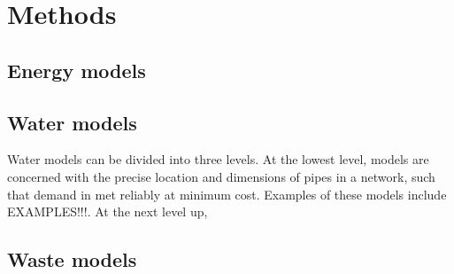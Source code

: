 \section{Methods}
\label{sec:methods}

\subsection{Energy models}
 
\subsection{Water models}
Water models can be divided into three levels. At the lowest level, models are concerned with the precise location and dimensions of pipes in a network, such that demand in met reliably at minimum cost. Examples of these models include EXAMPLES!!!.  At the next level up, 
 
\subsection{Waste models}



